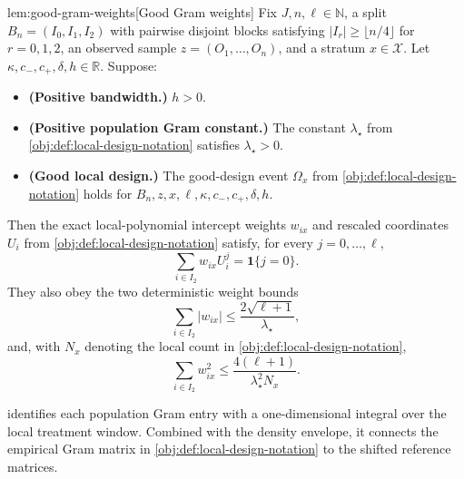 \begin{lemmav}{lem:good-gram-weights}[Good Gram weights]
Fix \(J,n,\ell\in\mathbb N\), a split \(B_n=(I_0,I_1,I_2)\) with pairwise disjoint blocks satisfying \(|I_r|\ge \lfloor n/4\rfloor\) for \(r=0,1,2\), an observed sample \(z=(O_1,\ldots,O_n)\), and a stratum \(x\in\mathcal X\).  Let \(\kappa,c_-,c_+,\delta,h\in\mathbb R\).  Suppose:
\begin{itemize}
\item \textbf{(Positive bandwidth.)} \(h>0\).
\item \textbf{(Positive population Gram constant.)} The constant \(\lambda_\star\) from \cref{obj:def:local-design-notation} satisfies \(\lambda_\star>0\).
\item \textbf{(Good local design.)} The good-design event \(\Omega_x\) from \cref{obj:def:local-design-notation} holds for \(B_n,z,x,\ell,\kappa,c_-,c_+,\delta,h\).
\end{itemize}
Then the exact local-polynomial intercept weights \(w_{ix}\) and rescaled coordinates \(U_i\) from \cref{obj:def:local-design-notation} satisfy, for every \(j=0,\ldots,\ell\),
\[
\sum_{i\in I_2} w_{ix} U_i^j=\mathbf 1\{j=0\}.
\]
They also obey the two deterministic weight bounds
\[
\sum_{i\in I_2}|w_{ix}|
\le
\frac{2\sqrt{\ell+1}}{\lambda_\star},
\]
and, with \(N_x\) denoting the local count in \cref{obj:def:local-design-notation},
\[
\sum_{i\in I_2}w_{ix}^2
\le
\frac{4(\ell+1)}{\lambda_\star^2 N_x}.
\]
\end{lemmav}

 identifies each population Gram entry with a one-dimensional integral over the local treatment window. Combined with the density envelope, it connects the empirical Gram matrix in \cref{obj:def:local-design-notation} to the shifted reference matrices.

